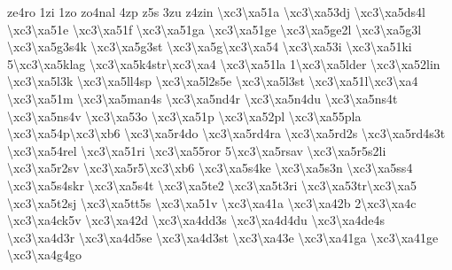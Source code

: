 {ze4ro 1zi 1zo zo4nal 4zp z5s 3zu z4zin \textbackslash{}xc3\textbackslash{}xa51a \textbackslash{}xc3\textbackslash{}xa53dj \textbackslash{}xc3\textbackslash{}xa5ds4l \textbackslash{}xc3\textbackslash{}xa51e \textbackslash{}xc3\textbackslash{}xa51f \textbackslash{}xc3\textbackslash{}xa51ga \textbackslash{}xc3\textbackslash{}xa51ge \textbackslash{}xc3\textbackslash{}xa5ge2l \textbackslash{}xc3\textbackslash{}xa5g3l \textbackslash{}xc3\textbackslash{}xa5g3s4k \textbackslash{}xc3\textbackslash{}xa5g3st \textbackslash{}xc3\textbackslash{}xa5g\textbackslash{}xc3\textbackslash{}xa54 \textbackslash{}xc3\textbackslash{}xa53i \textbackslash{}xc3\textbackslash{}xa51ki 5\textbackslash{}xc3\textbackslash{}xa5klag \textbackslash{}xc3\textbackslash{}xa5k4str\textbackslash{}xc3\textbackslash{}xa4 \textbackslash{}xc3\textbackslash{}xa51la 1\textbackslash{}xc3\textbackslash{}xa5lder \textbackslash{}xc3\textbackslash{}xa52lin \textbackslash{}xc3\textbackslash{}xa5l3k \textbackslash{}xc3\textbackslash{}xa5ll4sp \textbackslash{}xc3\textbackslash{}xa5l2s5e \textbackslash{}xc3\textbackslash{}xa5l3st \textbackslash{}xc3\textbackslash{}xa51l\textbackslash{}xc3\textbackslash{}xa4 \textbackslash{}xc3\textbackslash{}xa51m \textbackslash{}xc3\textbackslash{}xa5man4s \textbackslash{}xc3\textbackslash{}xa5nd4r \textbackslash{}xc3\textbackslash{}xa5n4du \textbackslash{}xc3\textbackslash{}xa5ns4t \textbackslash{}xc3\textbackslash{}xa5ns4v \textbackslash{}xc3\textbackslash{}xa53o \textbackslash{}xc3\textbackslash{}xa51p \textbackslash{}xc3\textbackslash{}xa52pl \textbackslash{}xc3\textbackslash{}xa55pla \textbackslash{}xc3\textbackslash{}xa54p\textbackslash{}xc3\textbackslash{}xb6 \textbackslash{}xc3\textbackslash{}xa5r4do \textbackslash{}xc3\textbackslash{}xa5rd4ra \textbackslash{}xc3\textbackslash{}xa5rd2s \textbackslash{}xc3\textbackslash{}xa5rd4s3t \textbackslash{}xc3\textbackslash{}xa54rel \textbackslash{}xc3\textbackslash{}xa51ri \textbackslash{}xc3\textbackslash{}xa55ror 5\textbackslash{}xc3\textbackslash{}xa5rsav \textbackslash{}xc3\textbackslash{}xa5r5s2li \textbackslash{}xc3\textbackslash{}xa5r2sv \textbackslash{}xc3\textbackslash{}xa5r5\textbackslash{}xc3\textbackslash{}xb6 \textbackslash{}xc3\textbackslash{}xa5s4ke \textbackslash{}xc3\textbackslash{}xa5s3n \textbackslash{}xc3\textbackslash{}xa5ss4 \textbackslash{}xc3\textbackslash{}xa5s4skr \textbackslash{}xc3\textbackslash{}xa5s4t \textbackslash{}xc3\textbackslash{}xa5te2 \textbackslash{}xc3\textbackslash{}xa5t3ri \textbackslash{}xc3\textbackslash{}xa53tr\textbackslash{}xc3\textbackslash{}xa5 \textbackslash{}xc3\textbackslash{}xa5t2sj \textbackslash{}xc3\textbackslash{}xa5tt5s \textbackslash{}xc3\textbackslash{}xa51v \textbackslash{}xc3\textbackslash{}xa41a \textbackslash{}xc3\textbackslash{}xa42b 2\textbackslash{}xc3\textbackslash{}xa4c \textbackslash{}xc3\textbackslash{}xa4ck5v \textbackslash{}xc3\textbackslash{}xa42d \textbackslash{}xc3\textbackslash{}xa4dd3s \textbackslash{}xc3\textbackslash{}xa4d4du \textbackslash{}xc3\textbackslash{}xa4de4s \textbackslash{}xc3\textbackslash{}xa4d3r \textbackslash{}xc3\textbackslash{}xa4d5se \textbackslash{}xc3\textbackslash{}xa4d3st \textbackslash{}xc3\textbackslash{}xa43e \textbackslash{}xc3\textbackslash{}xa41ga \textbackslash{}xc3\textbackslash{}xa41ge \textbackslash{}xc3\textbackslash{}xa4g4go }
